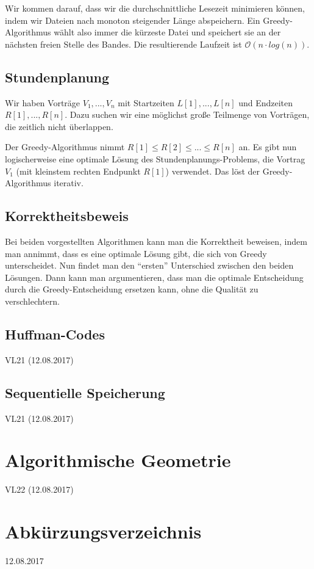 \documentclass[12pt]{article}
\begin{document}
Wir kommen darauf, dass wir die durchschnittliche Lesezeit minimieren können, indem wir Dateien nach monoton steigender Länge abspeichern. Ein Greedy-Algorithmus wählt also immer die kürzeste Datei und speichert sie an der nächsten freien Stelle des Bandes. Die resultierende Laufzeit ist $\mathcal O(n \cdot log(n))$.

\subsection{Stundenplanung}
Wir haben Vorträge $V_1, ..., V_n$ mit Startzeiten $L[1], ..., L[n]$ und Endzeiten $R[1], ..., R[n]$. Dazu suchen wir eine möglichst große Teilmenge von Vorträgen, die zeitlich nicht überlappen.

Der Greedy-Algorithmus nimmt $R[1] \leq R[2] \leq ... \leq R[n]$ an. Es gibt nun logischerweise eine optimale Lösung des Stundenplanungs-Problems, die Vortrag $V_1$ (mit kleinstem rechten Endpunkt $R[1]$) verwendet. Das löst der Greedy-Algorithmus iterativ.

\subsection{Korrektheitsbeweis}
Bei beiden vorgestellten Algorithmen kann man die Korrektheit beweisen, indem man annimmt, dass es eine optimale Lösung gibt, die sich von Greedy unterscheidet. Nun findet man den \enquote{ersten} Unterschied zwischen den beiden Lösungen. Dann kann man argumentieren, dass man die optimale Entscheidung durch die Greedy-Entscheidung ersetzen kann, ohne die Qualität zu verschlechtern.

\subsection{Huffman-Codes}
VL21 (12.08.2017)

\subsection{Sequentielle Speicherung}
VL21 (12.08.2017)

\section{Algorithmische Geometrie}

VL22 (12.08.2017)

\section{Abkürzungsverzeichnis}

12.08.2017
\end{document}
